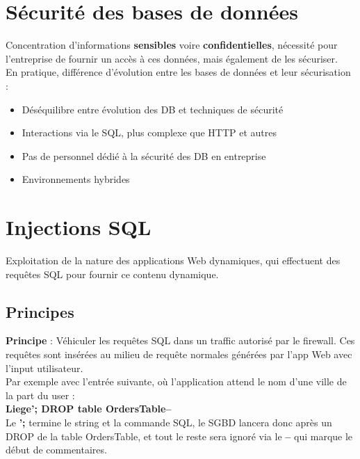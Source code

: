 \documentclass{report}
\begin{document}
	\section{Sécurité des bases de données}

		Concentration d'informations \textbf{sensibles} voire \textbf{confidentielles}, nécessité pour l'entreprise de fournir un accès à ces données, mais également de les sécuriser.\\

		En pratique, différence d'évolution entre les bases de données et leur sécurisation : \\

		\begin{itemize}
			\item Déséquilibre entre évolution des DB et techniques de sécurité
			\item Interactions via le SQL, plus complexe que HTTP et autres
			\item Pas de personnel dédié à la sécurité des DB en entreprise
			\item Environnements hybrides\\
		\end{itemize}

	\section{Injections SQL}

		Exploitation de la nature des applications Web dynamiques, qui effectuent des requêtes SQL pour fournir ce contenu dynamique.\\

		\subsection{Principes}

			\textbf{Principe} : Véhiculer les requêtes SQL dans un traffic autorisé par le firewall. Ces requêtes sont insérées au milieu de requête normales générées par l'app Web avec l'input utilisateur.\\

			Par exemple avec l'entrée suivante, où l'application attend le nom d'une ville de la part du user : \\

			\textbf{Liege’; DROP table OrdersTable--}\\

			Le \textbf{';} termine le string et la commande SQL, le SGBD lancera donc après un DROP de la table OrdersTable, et tout le reste sera ignoré via le \textbf{--} qui marque le début de commentaires.\\
\end{document}
